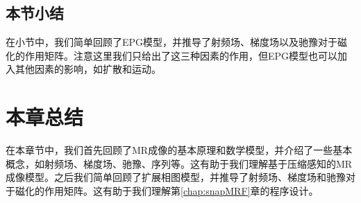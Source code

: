 \subsection{本节小结}
在小节中，我们简单回顾了EPG模型，并推导了射频场、梯度场以及驰豫对于磁化的作用矩阵。注意这里我们只给出了这三种因素的作用，但EPG模型也可以加入其他因素的影响，如扩散和运动。

\section{本章总结}
在本章节中，我们首先回顾了MR成像的基本原理和数学模型，并介绍了一些基本概念，如射频场、梯度场、驰豫、序列等。这有助于我们理解基于压缩感知的MR成像模型。之后我们简单回顾了扩展相图模型，并推导了射频场、梯度场和驰豫对于磁化的作用矩阵。这有助于我们理解第\ref{chap:snapMRF}章的程序设计。














